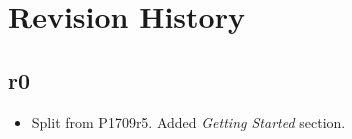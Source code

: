 \section{Revision History}

\subsection*{\paperno r0}

\begin{itemize}
      \item Split from P1709r5. Added \textit{Getting Started} section.
\end{itemize}
